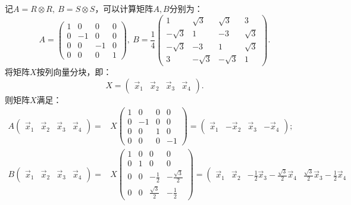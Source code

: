 \documentclass[reqno,a4paper,12pt]{amsart}
\begin{document}
\begin{tcolorbox}[breakable, colback = black!5!white, colframe = black]
记$A = R\otimes R,~B = S\otimes S$，可以计算矩阵$A,B$分别为：
\[
	A = \left( \begin{matrix}
		1 & 0 & 0 & 0 \\
		0 & -1 & 0 & 0 \\
		0 & 0 & -1 & 0 \\
		0 & 0 & 0 & 1
	\end{matrix} \right), ~ 
	B = \frac{1}{4} \left( \begin{matrix}
		1 & \sqrt{3} & \sqrt{3} & 3 \\
		-\sqrt{3} & 1 & -3 & \sqrt{3} \\
		-\sqrt{3} & -3 & 1 & \sqrt{3} \\
		3 & -\sqrt{3} & -\sqrt{3} & 1
	\end{matrix} \right).
\]
将矩阵$X$按列向量分块，即：
\[
	X = \left( \begin{matrix}
		\vec{x}_1 & \vec{x}_2 & \vec{x}_3 & \vec{x}_4
	\end{matrix} \right).
\]
则矩阵$X$满足：
\begin{align*}
	A\left( \begin{matrix}
		\vec{x}_1 & \vec{x}_2 & \vec{x}_3 & \vec{x}_4
	\end{matrix} \right) =& X \left( \begin{matrix}
		1 & 0 & 0 & 0 \\
		0 & -1 & 0 & 0 \\
		0 & 0 & 1 & 0 \\
		0 & 0 & 0 & -1
	\end{matrix} \right) = \left( \begin{matrix}
		\vec{x}_1 & -\vec{x}_2 & \vec{x}_3 & -\vec{x}_4
	\end{matrix} \right); \\
	B\left( \begin{matrix}
		\vec{x}_1 & \vec{x}_2 & \vec{x}_3 & \vec{x}_4
	\end{matrix} \right) =& X \left( \begin{matrix}
		1 & 0 & 0 & 0 \\
		0 & 1 & 0 & 0 \\
		0 & 0 & -\frac{1}{2} & -\frac{\sqrt{3}}{2} \\
		0 & 0 & \frac{\sqrt{3}}{2} & -\frac{1}{2}
	\end{matrix} \right) = \left( \begin{matrix}
		\vec{x}_1 & \vec{x}_2 & -\frac{1}{2}\vec{x}_3-\frac{\sqrt{3}}{2}\vec{x}_4 & \frac{\sqrt{3}}{2}\vec{x}_3-\frac{1}{2}\vec{x}_4

\end{matrix}
\end{align*}
\end{tcolorbox}
\end{document}
